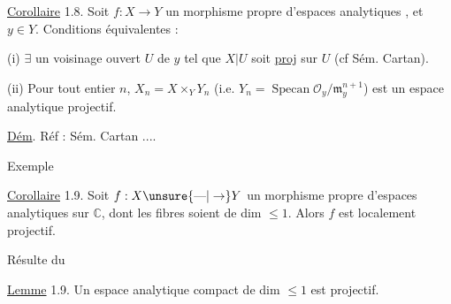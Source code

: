 \uline{Corollaire} 1.8. Soit $f:X\to Y$ un morphisme propre d'espaces analytiques , et $y\in Y$. Conditions équivalentes :

(i) $\exists$ un voisinage ouvert $U$ de $y$ tel que $X|U$ soit \uline{proj} sur $U$ (cf Sém. Cartan).

(ii) Pour tout entier $n$, $X_n=X\times_Y Y_n$ (i.e. $Y_n=\operatorname{Specan}\mathcal O_y/\mathfrak m_y^{n+1}$) est  un espace analytique projectif.

\uline{Dém}. Réf : Sém. Cartan ....

Exemple

\uline{Corollaire}  1.9.  Soit $f:X\unsure{\text{---}|\to}Y$ un morphisme propre d'espaces analytiques sur $\mathbb C$,  dont les fibres soient de dim $\leq 1$. Alors $f$ est localement projectif.

Résulte du

\uline{Lemme} 1.9. Un espace analytique compact de dim $\leq 1$ est projectif.

